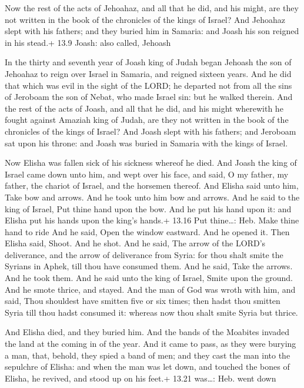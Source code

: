  Now the rest of the acts of Jehoahaz, and all that he
did, and his might, are they not written in the book of the chronicles
of the kings of Israel?  And Jehoahaz slept with his
fathers; and they buried him in Samaria: and Joash his son reigned in
his stead.+ 13.9 Joash: also called, Jehoash

 In the thirty and seventh year of Joash king of Judah
began Jehoash the son of Jehoahaz to reign over Israel in Samaria, and
reigned sixteen years.  And he did that which was evil in
the sight of the LORD; he departed not from all the sins of Jeroboam the
son of Nebat, who made Israel sin: but he walked therein. 
And the rest of the acts of Joash, and all that he did, and his might
wherewith he fought against Amaziah king of Judah, are they not written
in the book of the chronicles of the kings of Israel?  And
Joash slept with his fathers; and Jeroboam sat upon his throne: and
Joash was buried in Samaria with the kings of Israel.

 Now Elisha was fallen sick of his sickness whereof he
died. And Joash the king of Israel came down unto him, and wept over his
face, and said, O my father, my father, the chariot of Israel, and the
horsemen thereof.  And Elisha said unto him, Take bow and
arrows. And he took unto him bow and arrows.  And he said
to the king of Israel, Put thine hand upon the bow. And he put his hand
upon it: and Elisha put his hands upon the king's hands.+ 13.16 Put
thine\ldots: Heb. Make thine hand to ride  And he said,
Open the window eastward. And he opened it. Then Elisha said, Shoot. And
he shot. And he said, The arrow of the LORD's deliverance, and the arrow
of deliverance from Syria: for thou shalt smite the Syrians in Aphek,
till thou have consumed them.  And he said, Take the
arrows. And he took them. And he said unto the king of Israel, Smite
upon the ground. And he smote thrice, and stayed.  And the
man of God was wroth with him, and said, Thou shouldest have smitten
five or six times; then hadst thou smitten Syria till thou hadst
consumed it: whereas now thou shalt smite Syria but thrice.

 And Elisha died, and they buried him. And the bands of
the Moabites invaded the land at the coming in of the year.
 And it came to pass, as they were burying a man, that,
behold, they spied a band of men; and they cast the man into the
sepulchre of Elisha: and when the man was let down, and touched the
bones of Elisha, he revived, and stood up on his feet.+ 13.21 was\ldots:
Heb. went down

